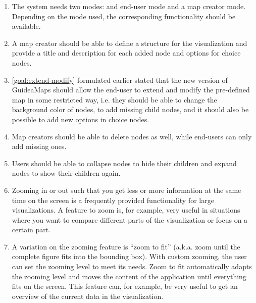 \begin{enumerate}[label=\textbf{FR \arabic*}., labelindent=0.5cm, ref=FR \arabic*, leftmargin=*]

	\item \label{fr:modes-rights}
		The system needs two modes: and end-user mode and a map creator mode. Depending on the mode used, the corresponding functionality should be available. 
	
	\item \label{fr:mapcreator:template}
		A map creator should be able to define a structure for the visualization and provide a title and description for each added node and options for choice nodes.
		
	\item \label{fr:customization} 
		\ref{goal:extend-modify} formulated earlier stated that the new version of GuideaMaps should allow the end-user to extend and modify the pre-defined map in some restricted way, i.e. they should be able to change the background color of nodes, to add missing child nodes, and it should also be possible to add new options in choice nodes. 
	
	\item \label{fr:delete-nodes}
		Map creators should be able to delete nodes as well, while end-users can only add missing ones.
		
	\item \label{fr:expand-collapse}
		Users should be able to collapse nodes to hide their children and expand nodes to show their children again.
  
	\item \label{fr:zoom}
		Zooming in or out such that you get less or more information at the same time on the screen is a frequently provided functionality for large visualizations. A feature to zoom is, for example, very useful in situations where you want to compare different parts of the visualization or focus on a certain part.
	
	\item \label{fr:zoom-to-fit}
		A variation on the zooming feature is ``zoom to fit'' (a.k.a. zoom until the complete figure fits into the bounding box). With custom zooming, the user can set the zooming level to meet its needs. Zoom to fit automatically adapts the zooming level and moves the content of the application until everything fits on the screen. This feature can, for example, be very useful to get an overview of the current data in the visualization.
		

\end{enumerate}

